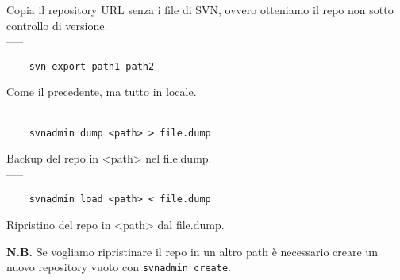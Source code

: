 \documentclass[a4paper]{article}
\begin{document}
	Copia il repository URL senza i file di SVN, ovvero otteniamo il repo non sotto controllo di versione.\\-----
	\begin{verbatim}
	svn export path1 path2
	\end{verbatim}
	Come il precedente, ma tutto in locale.\\-----
	\begin{verbatim}
	svnadmin dump <path> > file.dump
	\end{verbatim}
	Backup del repo in <path> nel file.dump.\\-----
	\begin{verbatim}
	svnadmin load <path> < file.dump
	\end{verbatim}
	Ripristino del repo in <path> dal file.dump. 
	
	\textbf{N.B.} Se vogliamo ripristinare il repo
	in un altro path è necessario creare un nuovo repository vuoto con
	\verb|svnadmin create|.
	
	
\end{document}
